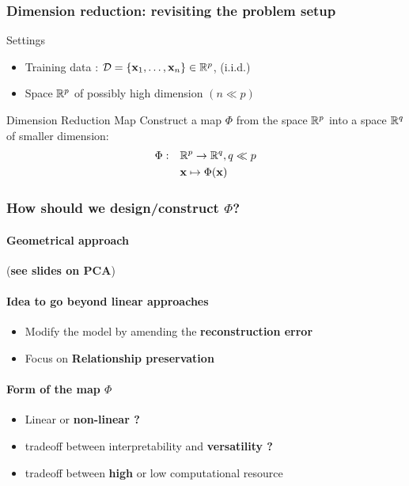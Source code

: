 \documentclass{beamer}\usepackage[]{graphicx}\usepackage[]{color}
\begin{document}
\begin{frame}
  \frametitle{Dimension reduction: revisiting the problem setup}

    \begin{block}{Settings}
      \begin{itemize}
        \item \alert{Training data} : $\mathcal{D}=\{\mathbf{x}_1,\ldots,\mathbf{x}_n\} \in \mathbb{R}^p$,   (i.i.d.)
        \item Space $\mathbb{R}^p$ of possibly high dimension $(n \ll p)$
      \end{itemize}
    \end{block}

    \vfill
    
    \begin{block}{Dimension Reduction Map}
       Construct a map $\Phi$ from the space $\mathbb{R}^{p}$ into a space $\mathbb{R}^{q}$ of \alert{smaller dimension}:
      \begin{align*}
          \Phi:\quad & \mathbb{R}^p \to \mathbb{R}^{q}, q \ll p\\
                     & \mathbf{x} \mapsto \Phi(\mathbf{x})
      \end{align*}
    \end{block}
    
\end{frame}

\begin{frame}
  \frametitle{How should we design/construct $\Phi$?}

  \paragraph{Geometrical approach} (\alert{\bf see slides on PCA})
  
  \vfill
  
  \paragraph{Idea to go beyond linear approaches}
  \begin{itemize}
    \item Modify the model by amending the \alert{\bf reconstruction error}
    \item Focus on \alert{\bf Relationship preservation}
  \end{itemize}

  \vfill
  
  \paragraph{Form of the map $\Phi$}
  \begin{itemize}
    \item  Linear or \alert{\bf non-linear ?}
    \item tradeoff between  interpretability and \alert{\bf versatility ?}
    \item tradeoff between  \alert{\bf high} or low computational resource
  \end{itemize}

\end{frame}
\end{document}
